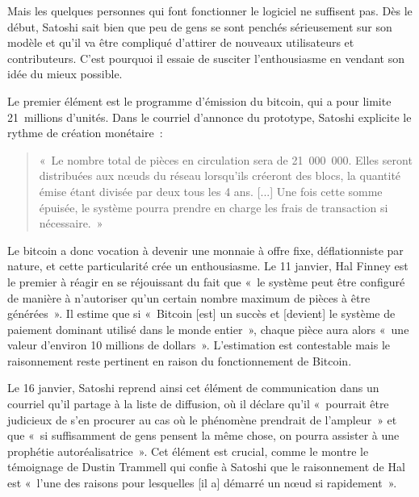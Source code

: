 

Mais les quelques personnes qui font fonctionner le logiciel ne suffisent pas. Dès le début, Satoshi sait bien que peu de gens se sont penchés sérieusement sur son modèle et qu'il va être compliqué d'attirer de nouveaux utilisateurs et contributeurs. C'est pourquoi il essaie de susciter l'enthousiasme en vendant son idée du mieux possible.


Le premier élément est le programme d'émission du bitcoin, qui a pour limite 21~millions d'unités. Dans le courriel d'annonce du prototype, Satoshi explicite le rythme de création monétaire~:

\begin{quote}
«~Le nombre total de pièces en circulation sera de 21~000~000. Elles seront distribuées aux nœuds du réseau lorsqu'ils créeront des blocs, la quantité émise étant divisée par deux tous les 4 ans. [...] Une fois cette somme épuisée, le système pourra prendre en charge les frais de transaction si nécessaire.~»
\end{quote}

Le bitcoin a donc vocation à devenir une monnaie à offre fixe, déflationniste par nature, et cette particularité crée un enthousiasme. Le 11 janvier, Hal Finney est le premier à réagir en se réjouissant du fait que «~le système peut être configuré de manière à n'autoriser qu'un certain nombre maximum de pièces à être générées~». Il estime que si «~Bitcoin [est] un succès et [devient] le système de paiement dominant utilisé dans le monde entier~», chaque pièce aura alors «~une valeur d'environ 10 millions de dollars~». L'estimation est contestable mais le raisonnement reste pertinent en raison du fonctionnement de Bitcoin.

Le 16 janvier, Satoshi reprend ainsi cet élément de communication dans un courriel qu'il partage à la liste de diffusion, où il déclare qu'il «~pourrait être judicieux de s'en procurer au cas où le phénomène prendrait de l'ampleur~» et que «~si suffisamment de gens pensent la même chose, on pourra assister à une prophétie autoréalisatrice~». Cet élément est crucial, comme le montre le témoignage de Dustin Trammell qui confie à Satoshi que le raisonnement de Hal est «~l'une des raisons pour lesquelles [il a] démarré un nœud si rapidement~».

